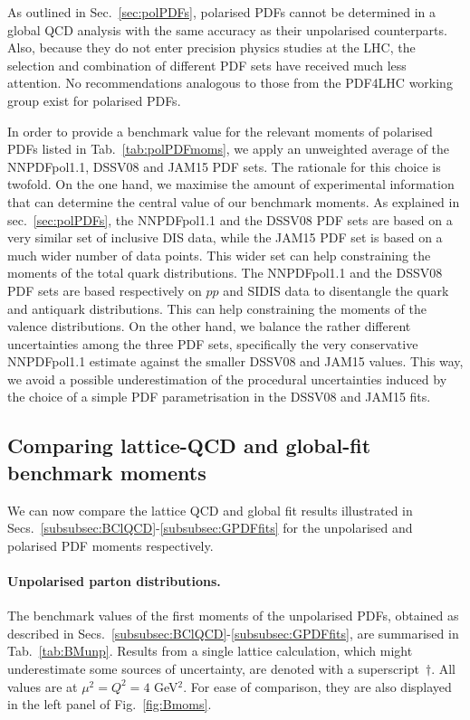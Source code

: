 As outlined in Sec.~\ref{sec:polPDFs}, polarised PDFs cannot be determined in a 
global QCD analysis with the same accuracy as their unpolarised counterparts.
%
Also, because they do not enter precision physics studies at the LHC, the
selection and combination of different PDF sets have received much less
attention.
%
No recommendations analogous to those from the PDF4LHC working group
exist for polarised PDFs.

In order to provide a benchmark value for the relevant moments of 
polarised PDFs listed in Tab.~\ref{tab:polPDFmoms}, we apply an unweighted 
average of the NNPDFpol1.1, DSSV08 and JAM15 PDF sets.
%
The rationale for this choice is twofold.
%
On the one hand, we maximise the amount of experimental information 
that can determine the central value of our benchmark moments.
%
As explained in sec.~\ref{sec:polPDFs}, the NNPDFpol1.1 and the DSSV08 PDF 
sets are based on a very similar set of inclusive DIS data, while the JAM15 
PDF set is based on a much wider number of data points.
%
This wider set can help constraining the moments of the total quark 
distributions.
%
The NNPDFpol1.1 and the DSSV08 PDF sets are based respectively on $pp$ and 
SIDIS data to disentangle the quark and antiquark distributions.
%
This can help constraining the moments of the valence distributions.
%
On the other hand, we balance the rather different uncertainties among the 
three PDF sets, specifically the very conservative NNPDFpol1.1 estimate
against the smaller DSSV08 and JAM15 values.
%
This way, we avoid a possible underestimation of the procedural
uncertainties induced by the choice of a simple PDF parametrisation 
in the DSSV08 and JAM15 fits.

\subsection{Comparing lattice-QCD and global-fit benchmark moments}
\label{subsec:BN}

We can now compare the lattice QCD and global fit results illustrated in 
Secs.~\ref{subsubsec:BClQCD}-\ref{subsubsec:GPDFfits} for the unpolarised
and polarised PDF moments respectively.

\paragraph{Unpolarised parton distributions.}
%
The benchmark values of the first moments of the unpolarised PDFs, obtained
as described in Secs.~\ref{subsubsec:BClQCD}-\ref{subsubsec:GPDFfits}, 
are summarised in Tab.~\ref{tab:BMunp}.
%
Results from a single lattice calculation, which might underestimate some 
sources of uncertainty, are denoted with a superscript~$\dagger$.
%
All values are at $\mu^2=Q^2=4$ GeV$^2$.
%
For ease of comparison, they are also displayed in 
the left panel of Fig.~\ref{fig:Bmoms}.

